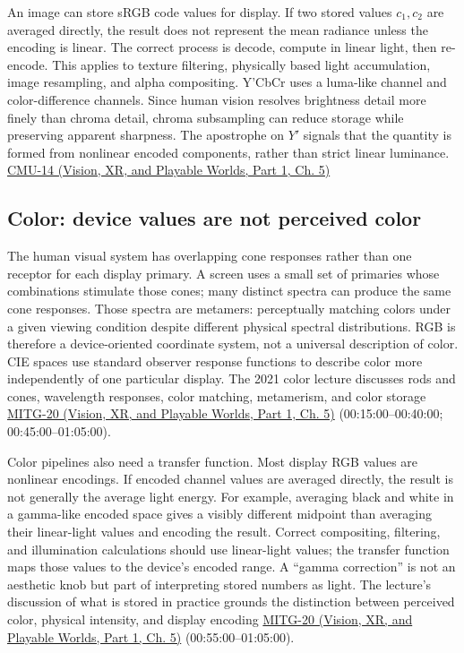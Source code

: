 An image can store sRGB code values for display. If two stored values \(c_1,c_2\) are averaged directly, the result does not represent the mean radiance unless the encoding is linear. The correct process is decode, compute in linear light, then re-encode. This applies to texture filtering, physically based light accumulation, image resampling, and alpha compositing. Y'CbCr uses a luma-like channel and color-difference channels. Since human vision resolves brightness detail more finely than chroma detail, chroma subsampling can reduce storage while preserving apparent sharpness. The apostrophe on \(Y'\) signals that the quantity is formed from nonlinear encoded components, rather than strict linear luminance. \href{../07-Vision-XR-and-Playable-Worlds-P01/main.pdf\#nameddest=04-visual-computing-ii-ch036-cmu-14---color}{CMU-14 (Vision, XR, and Playable Worlds, Part 1, Ch. 5)}

\subsection{Color: device values are not perceived color}\label{03-visual-computing-i-ch004-color-device-values-are-not-perceived-color}

\hypertarget{03-visual-computing-i-ch004-color-device-values-are-not-perceived-color}{}

The human visual system has overlapping cone responses rather than one receptor for each display primary. A screen uses a small set of primaries whose combinations stimulate those cones; many distinct spectra can produce the same cone responses. Those spectra are metamers: perceptually matching colors under a given viewing condition despite different physical spectral distributions. RGB is therefore a device-oriented coordinate system, not a universal description of color. CIE spaces use standard observer response functions to describe color more independently of one particular display. The 2021 color lecture discusses rods and cones, wavelength responses, color matching, metamerism, and color storage \href{../07-Vision-XR-and-Playable-Worlds-P01/main.pdf\#nameddest=04-visual-computing-ii-ch036-mitg-20---color}{MITG-20 (Vision, XR, and Playable Worlds, Part 1, Ch. 5)} (00:15:00--00:40:00; 00:45:00--01:05:00).

Color pipelines also need a transfer function. Most display RGB values are nonlinear encodings. If encoded channel values are averaged directly, the result is not generally the average light energy. For example, averaging black and white in a gamma-like encoded space gives a visibly different midpoint than averaging their linear-light values and encoding the result. Correct compositing, filtering, and illumination calculations should use linear-light values; the transfer function maps those values to the device's encoded range. A ``gamma correction'' is not an aesthetic knob but part of interpreting stored numbers as light. The lecture's discussion of what is stored in practice grounds the distinction between perceived color, physical intensity, and display encoding \href{../07-Vision-XR-and-Playable-Worlds-P01/main.pdf\#nameddest=04-visual-computing-ii-ch036-mitg-20---color}{MITG-20 (Vision, XR, and Playable Worlds, Part 1, Ch. 5)} (00:55:00--01:05:00).

